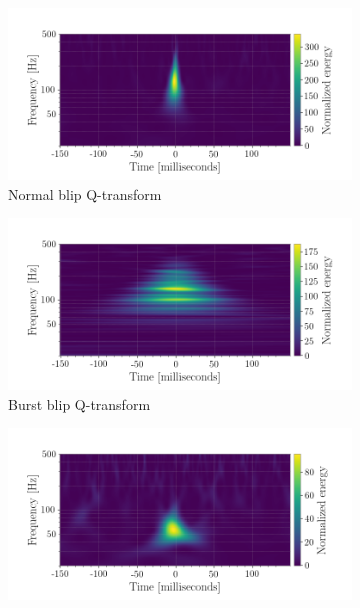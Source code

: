 \documentclass[a4paper]{article}
\begin{document}
\begin{figure}
	\centering
	\begin{subfigure}{.49\textwidth}
		\centering
		\includegraphics[width=1\linewidth]{normal_blip}
		\caption{Normal blip Q-transform}
		\label{fig:normal}
	\end{subfigure}
	\begin{subfigure}{.49\textwidth}
		\centering
		\includegraphics[width=1\linewidth]{burst_blip}
		\caption{Burst blip Q-transform}
		\label{fig:burst}
	\end{subfigure}
	\begin{subfigure}{.49\textwidth}
		\centering
		\includegraphics[width=1\linewidth]{dot_blip}

\end{subfigure}
\end{figure}
\end{document}
